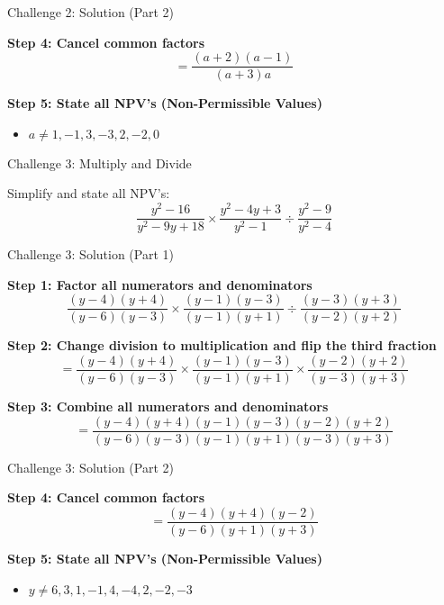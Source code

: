 \documentclass[aspectratio=169]{beamer}
\begin{document}
\begin{frame}{Challenge 2: Solution (Part 2)}
\begin{tcolorbox}[colback=lightgray,colframe=accent,title=Step-by-Step Solution (Part 2)]
\footnotesize
\textbf{Step 4: Cancel common factors}
\[
= \frac{(a+2)(a-1)}{(a+3)a}
\]

\textbf{Step 5: State all NPV's (Non-Permissible Values)}
\begin{itemize}
  \item $a \neq 1, -1, 3, -3, 2, -2, 0$
\end{itemize}
\end{tcolorbox}
\end{frame}

\begin{frame}{Challenge 3: Multiply and Divide}
\begin{tcolorbox}[colback=lightgray,colframe=primary,title=Challenge 3]
\footnotesize
Simplify and state all NPV's:
\[
\frac{y^2-16}{y^2-9y+18} \times \frac{y^2-4y+3}{y^2-1} \div \frac{y^2-9}{y^2-4}
\]
\end{tcolorbox}
\end{frame}

\begin{frame}{Challenge 3: Solution (Part 1)}
\begin{tcolorbox}[colback=lightgray,colframe=accent,title=Step-by-Step Solution (Part 1)]
\footnotesize
\textbf{Step 1: Factor all numerators and denominators}
\[
\frac{(y-4)(y+4)}{(y-6)(y-3)} \times \frac{(y-1)(y-3)}{(y-1)(y+1)} \div \frac{(y-3)(y+3)}{(y-2)(y+2)}
\]

\textbf{Step 2: Change division to multiplication and flip the third fraction}
\[
= \frac{(y-4)(y+4)}{(y-6)(y-3)} \times \frac{(y-1)(y-3)}{(y-1)(y+1)} \times \frac{(y-2)(y+2)}{(y-3)(y+3)}
\]

\textbf{Step 3: Combine all numerators and denominators}
\[
= \frac{(y-4)(y+4)(y-1)(y-3)(y-2)(y+2)}{(y-6)(y-3)(y-1)(y+1)(y-3)(y+3)}
\]
\end{tcolorbox}
\end{frame}

\begin{frame}{Challenge 3: Solution (Part 2)}
\begin{tcolorbox}[colback=lightgray,colframe=accent,title=Step-by-Step Solution (Part 2)]
\footnotesize
\textbf{Step 4: Cancel common factors}
\[
= \frac{(y-4)(y+4)(y-2)}{(y-6)(y+1)(y+3)}
\]

\textbf{Step 5: State all NPV's (Non-Permissible Values)}
\begin{itemize}
  \item $y \neq 6, 3, 1, -1, 4, -4, 2, -2, -3$
\end{itemize}
\end{tcolorbox}
\end{frame}
\end{document}
